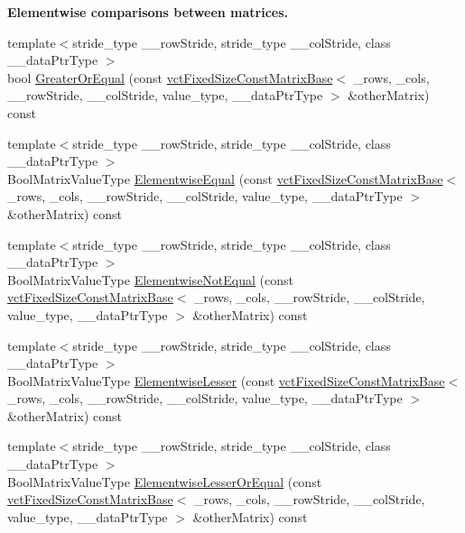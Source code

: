 \begin{Indent}{\bf Elementwise comparisons between matrices.}
\begin{DoxyCompactItemize}
\item 
{\footnotesize template$<$stride\-\_\-type \-\_\-\-\_\-row\-Stride, stride\-\_\-type \-\_\-\-\_\-col\-Stride, class \-\_\-\-\_\-data\-Ptr\-Type $>$ }\\bool \hyperlink{classvct_fixed_size_const_matrix_base_ac993327f1a65975912edee4cca952352}{Greater\-Or\-Equal} (const \hyperlink{classvct_fixed_size_const_matrix_base}{vct\-Fixed\-Size\-Const\-Matrix\-Base}$<$ \-\_\-rows, \-\_\-cols, \-\_\-\-\_\-row\-Stride, \-\_\-\-\_\-col\-Stride, value\-\_\-type, \-\_\-\-\_\-data\-Ptr\-Type $>$ \&other\-Matrix) const 
\item 
{\footnotesize template$<$stride\-\_\-type \-\_\-\-\_\-row\-Stride, stride\-\_\-type \-\_\-\-\_\-col\-Stride, class \-\_\-\-\_\-data\-Ptr\-Type $>$ }\\Bool\-Matrix\-Value\-Type \hyperlink{classvct_fixed_size_const_matrix_base_a8b806f5df4aed992388b48d16257adda}{Elementwise\-Equal} (const \hyperlink{classvct_fixed_size_const_matrix_base}{vct\-Fixed\-Size\-Const\-Matrix\-Base}$<$ \-\_\-rows, \-\_\-cols, \-\_\-\-\_\-row\-Stride, \-\_\-\-\_\-col\-Stride, value\-\_\-type, \-\_\-\-\_\-data\-Ptr\-Type $>$ \&other\-Matrix) const 
\item 
{\footnotesize template$<$stride\-\_\-type \-\_\-\-\_\-row\-Stride, stride\-\_\-type \-\_\-\-\_\-col\-Stride, class \-\_\-\-\_\-data\-Ptr\-Type $>$ }\\Bool\-Matrix\-Value\-Type \hyperlink{classvct_fixed_size_const_matrix_base_a5809f299296289e85bbcba58fe80ba22}{Elementwise\-Not\-Equal} (const \hyperlink{classvct_fixed_size_const_matrix_base}{vct\-Fixed\-Size\-Const\-Matrix\-Base}$<$ \-\_\-rows, \-\_\-cols, \-\_\-\-\_\-row\-Stride, \-\_\-\-\_\-col\-Stride, value\-\_\-type, \-\_\-\-\_\-data\-Ptr\-Type $>$ \&other\-Matrix) const 
\item 
{\footnotesize template$<$stride\-\_\-type \-\_\-\-\_\-row\-Stride, stride\-\_\-type \-\_\-\-\_\-col\-Stride, class \-\_\-\-\_\-data\-Ptr\-Type $>$ }\\Bool\-Matrix\-Value\-Type \hyperlink{classvct_fixed_size_const_matrix_base_a8a3cc5e0f39d2f830e969a7b287fdae1}{Elementwise\-Lesser} (const \hyperlink{classvct_fixed_size_const_matrix_base}{vct\-Fixed\-Size\-Const\-Matrix\-Base}$<$ \-\_\-rows, \-\_\-cols, \-\_\-\-\_\-row\-Stride, \-\_\-\-\_\-col\-Stride, value\-\_\-type, \-\_\-\-\_\-data\-Ptr\-Type $>$ \&other\-Matrix) const 
\item 
{\footnotesize template$<$stride\-\_\-type \-\_\-\-\_\-row\-Stride, stride\-\_\-type \-\_\-\-\_\-col\-Stride, class \-\_\-\-\_\-data\-Ptr\-Type $>$ }\\Bool\-Matrix\-Value\-Type \hyperlink{classvct_fixed_size_const_matrix_base_a829684bd56fa8e2169be5e280c61413b}{Elementwise\-Lesser\-Or\-Equal} (const \hyperlink{classvct_fixed_size_const_matrix_base}{vct\-Fixed\-Size\-Const\-Matrix\-Base}$<$ \-\_\-rows, \-\_\-cols, \-\_\-\-\_\-row\-Stride, \-\_\-\-\_\-col\-Stride, value\-\_\-type, \-\_\-\-\_\-data\-Ptr\-Type $>$ \&other\-Matrix) const 

\end{DoxyCompactItemize}
\end{Indent}
